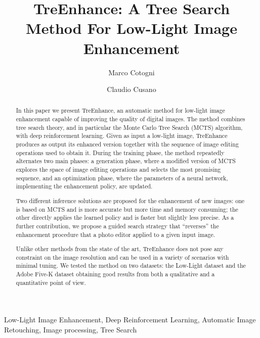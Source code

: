 \documentclass[3p,twocolumn]{elsarticle}
\newcommand{\method}[0]{TreEnhance}
\begin{document}
\begin{frontmatter}

\title{\method: A Tree Search Method For Low-Light Image Enhancement}

\author[1]{Marco Cotogni}
\author[1]{Claudio Cusano}

\address[1]{Dep.\ of Electrical, Computer and Biomedical Engineering, University of Pavia, Via Ferrata 1, Pavia, 27100, Italy}

\begin{abstract}
 In this paper we present \method{}, an automatic method for low-light image enhancement capable of improving the quality of digital images.  The method combines tree search theory, and in particular the Monte Carlo Tree Search (MCTS) algorithm, with deep reinforcement learning. Given as input a low-light image, \method{} produces as output its enhanced version together with the sequence of image editing operations used to obtain it. During the training phase, the method repeatedly alternates two main phases: a generation phase, where a modified version of MCTS explores the space of image editing operations and selects the most promising sequence, and an optimization phase, where the parameters of a neural network, implementing the enhancement policy, are updated. 
 
 Two different inference solutions are proposed for the enhancement of new images: one is based on MCTS and is more accurate but more time and memory consuming; the other directly applies the learned policy and is faster but slightly less precise. As a further contribution, we propose a guided search strategy that ``reverses'' the enhancement procedure that a photo editor applied to a given input image.


Unlike other methods from the state of the art, \method{} does not pose any constraint on the image resolution and can be used in a variety of scenarios with minimal tuning. We tested the method on two datasets: the Low-Light dataset and the Adobe Five-K dataset obtaining good results from both a qualitative and a quantitative point of view.


\end{abstract}

\begin{keyword}
Low-Light Image Enhancement, Deep Reinforcement Learning, Automatic Image Retouching, Image processing, Tree Search
\end{keyword}
\end{frontmatter}
\end{document}
